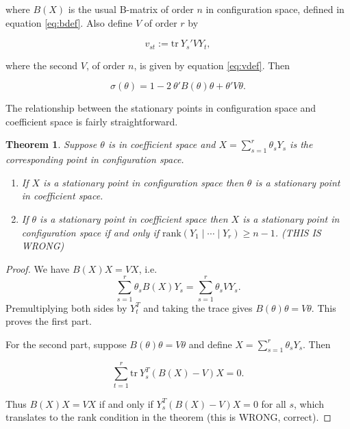 \documentclass[
  12pt,
]{book}
\providecommand{\tightlist}{%
  \setlength{\itemsep}{0pt}\setlength{\parskip}{0pt}}
\newtheorem{theorem}{Theorem}[chapter]
\theoremstyle{definition}
\theoremstyle{definition}
\theoremstyle{definition}
\theoremstyle{definition}
\theoremstyle{remark}
\begin{document}
where \(B(X)\) is the usual B-matrix of order \(n\) in configuration space, defined in equation \eqref{eq:bdef}. Also define \(V\) of order \(r\) by

\begin{equation}
v_{st}:=\text{tr}\ Y_s'VY_t,
\label{eq:propcoefv}
\end{equation}

where the second \(V\), of order \(n\), is given by equation \eqref{eq:vdef}. Then

\begin{equation}
\sigma(\theta)=1-2\ \theta'B(\theta)\theta+\theta'V\theta.
\label{eq:propcoefs}
\end{equation}

The relationship between the stationary points in configuration
space and coefficient space is fairly straightforward.

\begin{theorem}
\protect\hypertarget{thm:confcoef}{}{\label{thm:confcoef} }
Suppose \(\theta\) is in coefficient space and \(X=\sum_{s=1}^r\theta_s Y_s\) is the corresponding point in configuration space.

\begin{enumerate}
\def\labelenumi{\arabic{enumi}.}
\tightlist
\item
  If \(X\) is a stationary point in configuration space then \(\theta\) is a stationary point in coefficient space.
\item
  If \(\theta\) is a stationary point in coefficient space then \(X\) is a stationary point in configuration space
  if and only if \(\text{rank}(Y_1\mid\cdots\mid Y_r)\geq n-1\). (THIS IS WRONG)
\end{enumerate}
\end{theorem}

\begin{proof}
We have \(B(X)X=VX\), i.e.~
\begin{equation}
\sum_{s=1}^r \theta_s B(X)Y_s=\sum_{s=1}^r \theta_s VY_s.
\label{eq:propfitoff}
\end{equation}
Premultiplying both sides by \(Y_t^T\) and taking the trace gives \(B(\theta)\theta=V\theta\). This proves the first part.

For the second part, suppose \(B(\theta)\theta=V\theta\) and define
\(X=\sum_{s=1}^r\theta_s Y_s\). Then

\begin{equation}
\sum_{t=1}^r\text{tr}\ Y_s^T(B(X)-V)X=0.
\label{eq:propfftofi}
\end{equation}

Thus \(B(X)X=VX\) if and only if \(Y_s^T(B(X)-V)X=0\) for all \(s\), which translates to the rank condition in the theorem (this is WRONG, correct).
\end{proof}
\end{document}
